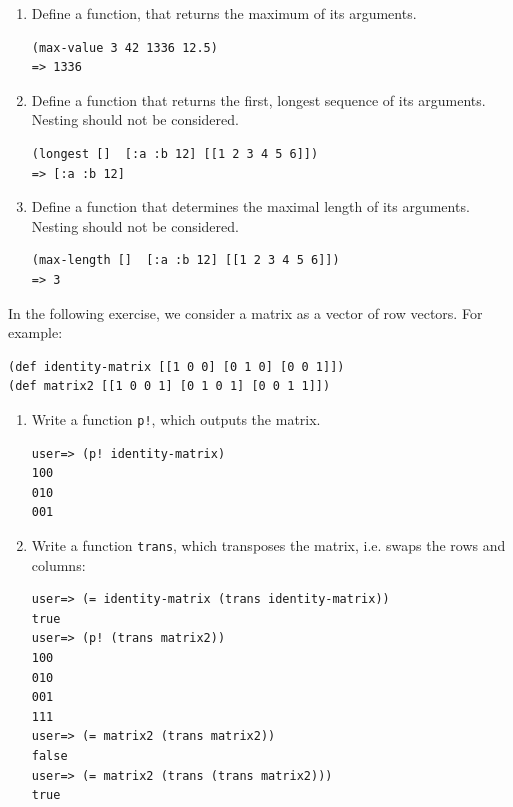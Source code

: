 \documentclass[11pt,a4paper]{article}
\begin{document}
\pagebreak

\begin{exercise}[Maxima]

\begin{enumerate}[label=\alph*)]
\item
  Define a function, that returns the maximum of its arguments.
\begin{verbatim}
(max-value 3 42 1336 12.5)
=> 1336
\end{verbatim}
\item
  Define a function that returns the first, longest sequence of its arguments. Nesting should not be considered.
\begin{verbatim}
(longest []  [:a :b 12] [[1 2 3 4 5 6]])
=> [:a :b 12]
\end{verbatim}
\item
  Define a function that determines the maximal length of its arguments. Nesting should not be considered.
\begin{verbatim}
(max-length []  [:a :b 12] [[1 2 3 4 5 6]])
=> 3
\end{verbatim}

\end{enumerate}
\end{exercise}



\begin{exercise}[Matrix]
In the following exercise, we consider a matrix as a vector of row vectors. For example:
\begin{verbatim}
(def identity-matrix [[1 0 0] [0 1 0] [0 0 1]])
(def matrix2 [[1 0 0 1] [0 1 0 1] [0 0 1 1]])
\end{verbatim}

\begin{enumerate}[label=\alph*)]
\item Write a function \verb|p!|, which outputs the matrix.
\begin{verbatim}
user=> (p! identity-matrix)
100
010
001
\end{verbatim}
  
\item Write a function \verb|trans|, which transposes the matrix, i.e. swaps the rows and columns:
\begin{verbatim}
user=> (= identity-matrix (trans identity-matrix))
true
user=> (p! (trans matrix2))
100
010
001
111
user=> (= matrix2 (trans matrix2))
false
user=> (= matrix2 (trans (trans matrix2)))
true 
\end{verbatim}
\end{enumerate}

\end{exercise}
\end{document}
